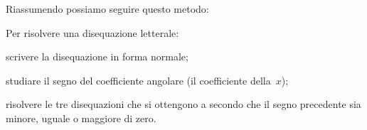 Riassumendo possiamo seguire questo metodo:

\begin{procedura}
 Per risolvere una disequazione letterale:
\begin{enumeratea}
 \item scrivere la disequazione in forma normale;
 \item studiare il segno del coefficiente angolare (il coefficiente 
della~\(x\));
 \item risolvere le tre disequazioni che si ottengono a secondo che il segno 
  precedente sia minore, uguale o maggiore di zero.
\end{enumeratea}
\end{procedura}






% 
% 
% 
% 
% 
% 
%  
% 
% 

